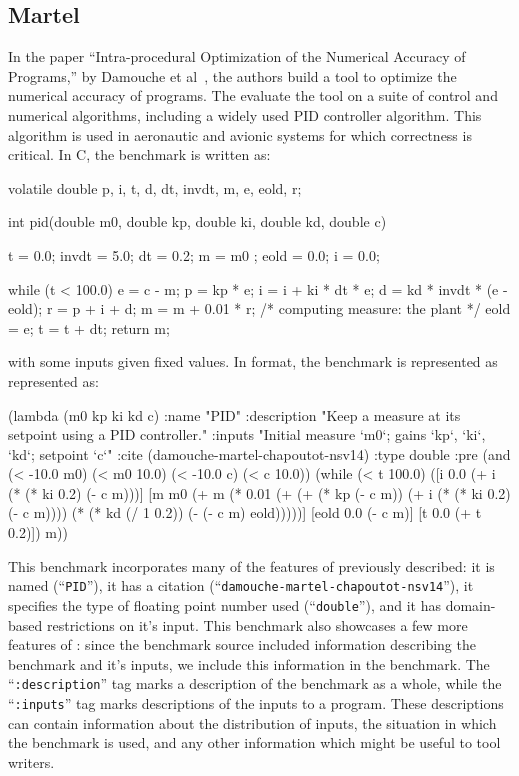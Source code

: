 \documentclass[main.tex]{subfiles}
\begin{document}
\subsection{Martel}
In the paper ``Intra-procedural Optimization of the Numerical Accuracy
of Programs,'' by Damouche et al~\cite{fmics15}, the authors build a
tool to optimize the numerical accuracy of programs. The evaluate the
tool on a suite of control and numerical algorithms, including a
widely used PID controller algorithm. This algorithm is used in
aeronautic and avionic systems for which correctness is critical. In
C, the benchmark is written as:

\begin{code}
volatile double p, i, t, d, dt, invdt, m, e, eold, r; 

int pid(double m0, double kp, double ki, double kd, double c){

  t     = 0.0;
  invdt = 5.0;
  dt    = 0.2;
  m     = m0 ;
  eold  = 0.0;
  i     = 0.0;
  
  while (t < 100.0) {
       e = c - m;
       p = kp * e;
       i = i + ki * dt * e;
       d = kd * invdt * (e - eold);
       r = p + i + d;
       m = m + 0.01 * r; /* computing measure: the plant */
       eold = e;
       t = t + dt;
  }
  return m;
}
\end{code}

with some inputs given fixed values. In \core format, the benchmark
is represented as represented as:

\begin{code}
(lambda (m0 kp ki kd c)
  :name "PID"
  :description 
  "Keep a measure at its setpoint using a PID controller."
  :inputs 
  "Initial measure `m0`; gains `kp`, `ki`, `kd`; setpoint `c`"
  :cite (damouche-martel-chapoutot-nsv14)
  :type double
  :pre (and (< -10.0 m0) (< m0 10.0) (< -10.0 c) (< c 10.0))
  (while
   (< t 100.0)
   ([i 0.0 (+ i (* (* ki 0.2) (- c m)))]
    [m m0
     (+ m (* 0.01 (+ (+ (* kp (- c m))
                        (+ i (* (* ki 0.2) (- c m))))
                     (* (* kd (/ 1 0.2))
                        (- (- c m) eold)))))]
    [eold 0.0 (- c m)]
    [t 0.0 (+ t 0.2)])
   m))
\end{code}

This benchmark incorporates many of the features of \core previously
described: it is named (``\verb|PID|''), it has a citation
(``\verb|damouche-martel-chapoutot-nsv14|''), it specifies the type of
floating point number used (``\verb|double|''), and it has
domain-based restrictions on it's input. This benchmark also showcases
a few more features of \core: since the benchmark source included
information describing the benchmark and it's inputs, we include this
information in the \name benchmark. The ``\verb|:description|'' tag
marks a description of the benchmark as a whole, while the
``\verb|:inputs|'' tag marks descriptions of the inputs to a
program. These descriptions can contain information about the
distribution of inputs, the situation in which the benchmark is used,
and any other information which might be useful to tool writers.
\end{document}
